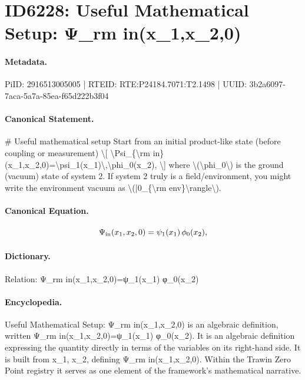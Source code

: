 \section*{ID6228: Useful Mathematical Setup: Ψ\_rm in(x\_1,x\_2,0)}
\paragraph{Metadata.}
PiID: 2916513005005 | RTEID: RTE:P24184.7071:T2.1498 | UUID: 3b2a6097-7aca-5a7a-85ea-f65d222b3f04

\paragraph{Canonical Statement.}
\# Useful mathematical setup Start from an initial product-like state (before coupling or measurement) \textbackslash{}[ \textbackslash{}Psi\_\{\textbackslash{}rm in\}(x\_1,x\_2,0)=\textbackslash{}psi\_1(x\_1)\textbackslash{},\textbackslash{}phi\_0(x\_2), \textbackslash{}] where \textbackslash{}(\textbackslash{}phi\_0\textbackslash{}) is the ground (vacuum) state of system 2. If system 2 truly is a field/environment, you might write the environment vacuum as \textbackslash{}(|0\_\{\textbackslash{}rm env\}\textbackslash{}rangle\textbackslash{}).

\paragraph{Canonical Equation.}
\[
\Psi_{\rm in}(x_1,x_2,0)=\psi_1(x_1)\,\phi_0(x_2),
\]

\paragraph{Dictionary.}
Relation: Ψ\_rm in(x\_1,x\_2,0)=ψ\_1(x\_1) φ\_0(x\_2)

\paragraph{Encyclopedia.}
Useful Mathematical Setup: Ψ\_rm in(x\_1,x\_2,0) is an algebraic definition, written Ψ\_rm in(x\_1,x\_2,0)=ψ\_1(x\_1) φ\_0(x\_2). It is an algebraic definition expressing the quantity directly in terms of the variables on its right-hand side. It is built from x\_1, x\_2, defining Ψ\_rm in(x\_1,x\_2,0). Within the Trawin Zero Point registry it serves as one element of the framework's mathematical narrative.
